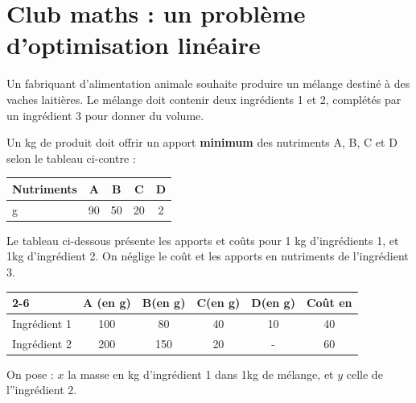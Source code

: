 \documentclass[main.tex]{subfiles}
\begin{document}
\section{Club maths : un problème d'optimisation linéaire}
\noindent	Un fabriquant d'alimentation animale souhaite produire un mélange destiné à des vaches laitières. Le mélange doit contenir deux ingrédients 1 et 2, complétés par un ingrédient 3 pour donner du volume.\\
\noindent
\parbox{0.65\linewidth}{
	Un \si{\kilo\gram} de produit doit offrir un apport \textbf{minimum} des nutriments A, B, C et D selon le tableau ci-contre :
}\hfill 
\parbox{0.3\linewidth}{
	\begin{tabularx}{0.32\columnwidth}{|X|c|*{3}{c|}}
		\hline
		Nutriments &      A  &    B &    C &    D\\ \hline 
		\si{\gram}  &        90&     50&    20&    2\\ \hline 
	\end{tabularx}
} 	


\noindent Le tableau ci-dessous présente les apports et coûts pour 1 \si{\kilo\gram} d'ingrédients 1, et 1\si{\kilo\gram} d'ingrédient 2. On néglige le coût et les apports en nutriments de l'ingrédient 3.

\begin{minipage}{1\columnwidth} \centering
	\begin{tabularx}{0.72\columnwidth}{|X|c|*{4}{c|}}
		\cline{2-6}
		\multicolumn{1}{c|}{\multirow{1}{*}{}}&A (en \si{\gram})&     B(en \si{\gram})&       C(en \si{\gram})&       D(en \si{\gram}) &  Coût en \EUR{}\\ \hline 
		Ingrédient 1  & 100  &  80 &     40  &    10 &    40\\ \hline 
		Ingrédient 2  &200 &   150 &    20 &     -   &   60\\ \hline 
	\end{tabularx}
\end{minipage}	

\noindent On pose : $x$ la masse en \si{\kilo\gram} d'ingrédient 1 dans 1\si{\kilo\gram} de mélange,
et $y$ celle de l''ingrédient 2.
\end{document}
